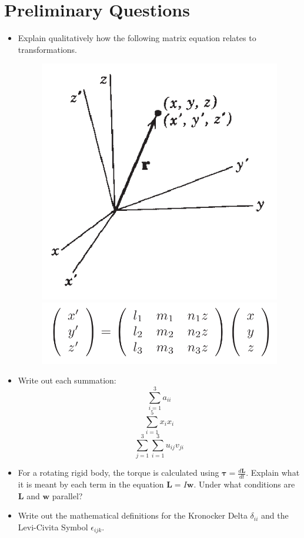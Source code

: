 \documentclass{article}
\begin{document}
\section{Preliminary Questions}
 \begin{itemize}
  \item Explain qualitatively how the following matrix equation relates to transformations.
  \begin{figure}[h]
\centering
\includegraphics[scale=0.2]{1}
\includegraphics[scale=0.3]{2}
\end{figure}
\item Write out each summation:
\begin{equation}
    \sum_{i=1}^{3} a_{ii}
\end{equation}
\begin{equation}
    \sum_{i=1}^{5} x_{i}x_i
\end{equation}
\begin{equation}
    \sum_{j=1}^{3} \sum_{i=1}^{3} u_{ij}v_{ji}
\end{equation}
  \item For a rotating rigid body, the torque is calculated using $\bm{\tau}=\frac{d\bm{L}}{dt}$. Explain what it is meant by each term in the equation $\bm{L}=I\bm{w}$. Under what conditions are $\bm{L}$ and $\bm{w}$ parallel?
  \item Write out the mathematical definitions for the Kronocker Delta $\delta_{ii}$ and the Levi-Civita Symbol $\epsilon_{ijk}$. 
  \end{itemize}
  \clearpage
\end{document}
